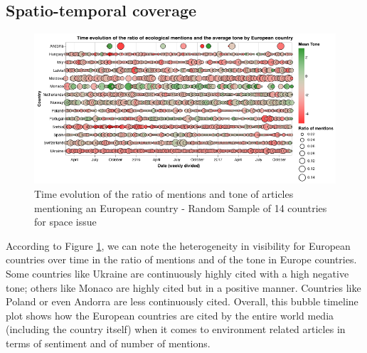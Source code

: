 \documentclass[11pt]{article}
\begin{document}
\subsection{Spatio-temporal coverage}

\begin{figure}[h]
   \includegraphics[scale=0.3]{timeline_europe_for_report.png}
    \caption{\label{timeline} Time evolution of the ratio of mentions and tone of articles mentioning an European country - Random Sample of 14 countries for space issue}
\end{figure}

According to Figure \ref{timeline}, we can note the heterogeneity in visibility for European countries over time in the ratio of mentions and of the tone in Europe countries. Some countries like Ukraine are continuously highly cited with a high negative tone; others like Monaco are highly cited but in a positive manner. Countries like Poland or even Andorra are less continuously cited. Overall, this bubble timeline plot shows how the European countries are cited by the entire world media (including the country itself) when it comes to environment related articles in terms of sentiment and of number of mentions. 
\end{document}

